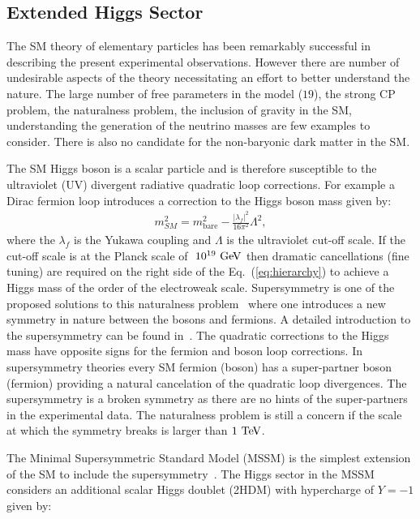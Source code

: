 \subsection{Extended Higgs Sector}

The SM theory of elementary particles has been remarkably successful in describing the present experimental observations. However there are number of undesirable aspects of the theory necessitating an effort to better understand the nature. The large number of free parameters in the model ($19$), the strong CP problem, the naturalness problem, the inclusion of gravity in the SM, understanding the generation of the neutrino masses are few examples to consider. There is also no candidate for the non-baryonic dark matter in the SM. 

The SM Higgs boson is a scalar particle and is therefore susceptible to the ultraviolet (UV) divergent radiative quadratic loop corrections. For example a Dirac fermion loop introduces a correction to the Higgs boson mass given by:
\begin{eqnarray} \label{eq:hierarchy}
m^{2}_{SM} = m^2_{\mathrm{bare}} - \frac{|\lambda_f|^2}{16\pi^2} \Lambda^2, 
\end{eqnarray}
where the $\lambda_f$ is the Yukawa coupling and $\Lambda$ is the ultraviolet cut-off scale. If the cut-off scale is at the Planck scale of $~10^{19}~\mathrm{Ge\kern -0.1em V}$  then dramatic cancellations (fine tuning) are required on the right side of the Eq.~(\ref{eq:hierarchy}) to achieve a Higgs mass of the order of the electroweak scale. Supersymmetry is one of the proposed solutions to this naturalness problem~\cite{Golfand:1971iw,Wess:1974tw} where one introduces a new symmetry in nature between the bosons and fermions. A detailed introduction to the supersymmetry can be found in~\cite{Martin:1997ns}. The quadratic corrections to the Higgs mass have opposite signs for the fermion and boson loop corrections. In supersymmetry theories every SM fermion (boson) has a super-partner boson (fermion) providing a natural cancelation of the quadratic loop divergences. The supersymmetry is a broken symmetry as there are no hints of the super-partners in the experimental data. The naturalness problem is still a concern if the scale at which the symmetry breaks is larger than $1~\mathrm{Te\kern -0.1em V}$.  

The Minimal Supersymmetric Standard Model (MSSM) is the simplest extension of the SM to include the supersymmetry~\cite{Fayet:1974pd,Fayet:1977yc}. The Higgs sector in the MSSM considers an additional scalar Higgs doublet (2HDM) with hypercharge of $Y=-1$ given by:
 
